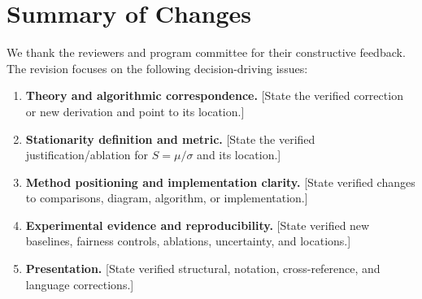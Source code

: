 \section*{Summary of Changes}

We thank the reviewers and program committee for their constructive feedback.
The revision focuses on the following decision-driving issues:

\begin{enumerate}
  \item \textbf{Theory and algorithmic correspondence.}
  [State the verified correction or new derivation and point to its location.]

  \item \textbf{Stationarity definition and metric.}
  [State the verified justification/ablation for $S=\mu/\sigma$ and its location.]

  \item \textbf{Method positioning and implementation clarity.}
  [State verified changes to comparisons, diagram, algorithm, or implementation.]

  \item \textbf{Experimental evidence and reproducibility.}
  [State verified new baselines, fairness controls, ablations, uncertainty, and locations.]

  \item \textbf{Presentation.}
  [State verified structural, notation, cross-reference, and language corrections.]
\end{enumerate}
